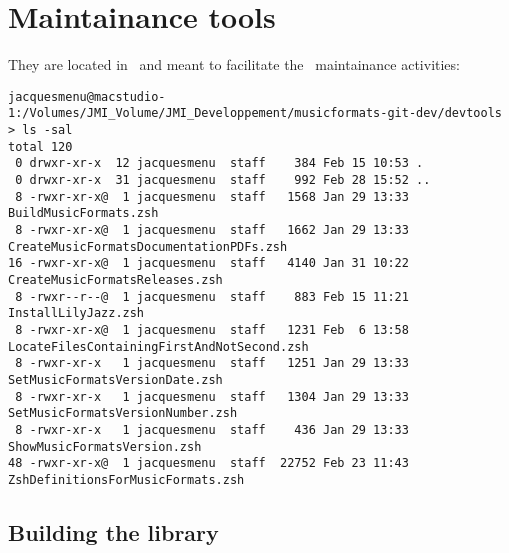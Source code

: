 



\chapter{Maintainance tools}\label{Maintainance tools}

They are located in \devtoolsFolder\ and meant to facilitate the \mf\ maintainance activities:
\begin{lstlisting}[language=Terminal]
jacquesmenu@macstudio-1:/Volumes/JMI_Volume/JMI_Developpement/musicformats-git-dev/devtools > ls -sal
total 120
 0 drwxr-xr-x  12 jacquesmenu  staff    384 Feb 15 10:53 .
 0 drwxr-xr-x  31 jacquesmenu  staff    992 Feb 28 15:52 ..
 8 -rwxr-xr-x@  1 jacquesmenu  staff   1568 Jan 29 13:33 BuildMusicFormats.zsh
 8 -rwxr-xr-x@  1 jacquesmenu  staff   1662 Jan 29 13:33 CreateMusicFormatsDocumentationPDFs.zsh
16 -rwxr-xr-x@  1 jacquesmenu  staff   4140 Jan 31 10:22 CreateMusicFormatsReleases.zsh
 8 -rwxr--r--@  1 jacquesmenu  staff    883 Feb 15 11:21 InstallLilyJazz.zsh
 8 -rwxr-xr-x@  1 jacquesmenu  staff   1231 Feb  6 13:58 LocateFilesContainingFirstAndNotSecond.zsh
 8 -rwxr-xr-x   1 jacquesmenu  staff   1251 Jan 29 13:33 SetMusicFormatsVersionDate.zsh
 8 -rwxr-xr-x   1 jacquesmenu  staff   1304 Jan 29 13:33 SetMusicFormatsVersionNumber.zsh
 8 -rwxr-xr-x   1 jacquesmenu  staff    436 Jan 29 13:33 ShowMusicFormatsVersion.zsh
48 -rwxr-xr-x@  1 jacquesmenu  staff  22752 Feb 23 11:43 ZshDefinitionsForMusicFormats.zsh
\end{lstlisting}


\section{Building the library}

